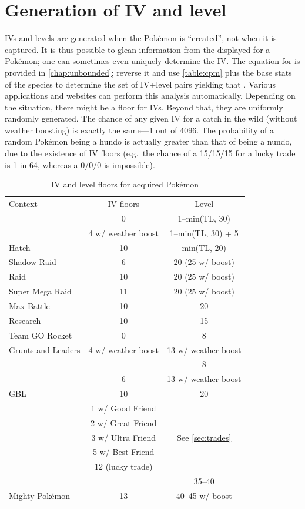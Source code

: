 \section{Generation of IV and level\label{sec:ivgeneration}}
IVs and levels are generated when the Pokémon is ``created'', not when it is captured.
It is thus possible to glean information from the \CP{} displayed for a Pokémon;
  one can sometimes even uniquely determine the IV\@.
The equation for \CP{} is provided in \autoref{chap:unbounded}; reverse it and
  use \autoref{table:cpm} plus the base stats of the species to determine
  the set of IV+level pairs yielding that \CP\@.
Various applications and websites can perform this analysis automatically.
Depending on the situation, there might be a floor for IVs.
Beyond that, they are uniformly randomly generated.
The chance of any given IV for a catch in the wild (without weather boosting)
  is exactly the same---1 out of 4096.
The probability of a random Pokémon being a hundo is actually
  greater than that of being a nundo, due to the existence of IV floors
  (e.g.\ the chance of a 15/15/15 for a lucky trade is 1 in 64, whereas
  a 0/0/0 is impossible).
\begin{table}
\footnotesize
\centering
\begin{tabular}{lcc}
Context & IV floors & Level \\
\rowcolor{Gray!25}
& 0 & 1--min(TL, 30) \\
\rowcolor{Gray!25}
\multirow{-2}{*}{Wild catch} & 4 w/ weather boost & 1--min(TL, 30) + 5 \\
Hatch & 10 & min(TL, 20) \\
\rowcolor{Gray!25}
Shadow Raid & 6 & 20 (25 w/ boost) \\
  Raid & 10 & 20 (25 w/ boost) \\
\rowcolor{Gray!25}
Super Mega Raid & 11 & 20 (25 w/ boost)\\
Max Battle & 10 & 20 \\
\rowcolor{Gray!25}
Research & 10 & 15 \\
Team GO Rocket & 0 & 8 \\
Grunts and Leaders & 4 w/ weather boost & 13 w/ weather boost \\
\rowcolor{Gray!25}
& & 8\\
\rowcolor{Gray!25}
\multirow{-2}{*}{Giovanni} & \multirow{-2}{*}{6} & 13 w/ weather boost\\
GBL & 10 & 20\\
\rowcolor{Gray!25}
& 1 w/ Good Friend &\\
\rowcolor{Gray!25}
& 2 w/ Great Friend & \\
\rowcolor{Gray!25}
\multirow{-2.5}{*}{Trade} & 3 w/ Ultra Friend & \multirow{-2.5}{*}{See \autoref{sec:trades}}  \\
\rowcolor{Gray!25}
& 5 w/ Best Friend & \\
\rowcolor{Gray!25}
& 12 (lucky trade) & \\
  & & 35--40 \\
  \multirow{-2}{*}{Mighty Pokémon} & \multirow{-2}{*}{13} & 40--45 w/ boost\\
\end{tabular}
\caption{IV and level floors for acquired Pokémon\label{table:ivfloors}}
\end{table}

